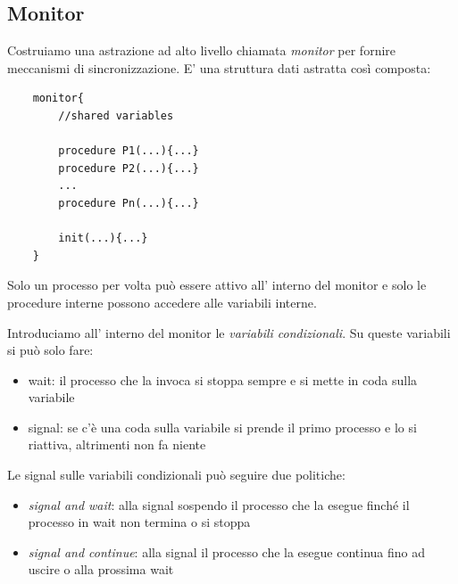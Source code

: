 \subsection{Monitor}
Costruiamo una astrazione ad alto livello chiamata \emph{monitor} per fornire meccanismi di sincronizzazione.
E' una struttura dati astratta così composta:
\begin{verbatim}
    monitor{
        //shared variables
        
        procedure P1(...){...}
        procedure P2(...){...}
        ...
        procedure Pn(...){...}

        init(...){...}
    }
\end{verbatim}
Solo un processo per volta può essere attivo all' interno del monitor e solo le procedure interne possono accedere alle variabili interne.

Introduciamo all' interno del monitor le \emph{variabili condizionali}.
Su queste variabili si può solo fare:
\begin{itemize}
    \item wait: il processo che la invoca si stoppa sempre e si mette in coda sulla variabile
    \item signal: se c'è una coda sulla variabile si prende il primo processo e lo si riattiva, altrimenti non fa niente
\end{itemize}
Le signal sulle variabili condizionali può seguire due politiche:
\begin{itemize}
    \item \emph{signal and wait}: alla signal sospendo il processo che la esegue finché il processo in wait non termina o si stoppa
    \item \emph{signal and continue}: alla signal il processo che la esegue continua fino ad uscire o alla prossima wait
\end{itemize}

